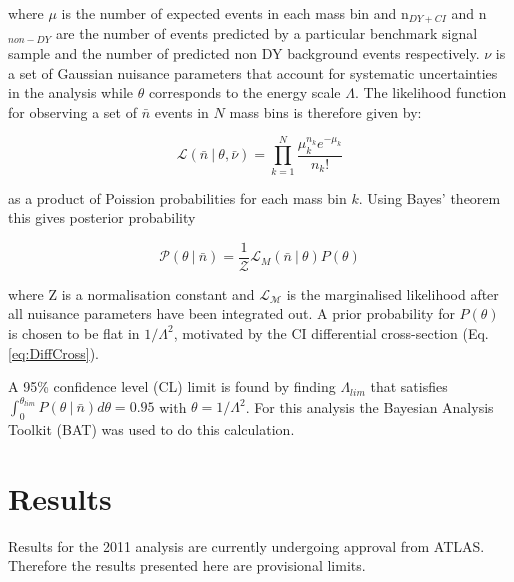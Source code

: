 where $\mu$ is the number of expected events in each mass bin and n$_{DY+CI}$ and n$_{non-DY}$ are the number of events predicted by a particular benchmark signal sample and the number of predicted non DY background events respectively. $\nu$ is a set of Gaussian nuisance parameters that account for systematic uncertainties in the analysis while $\theta$ corresponds to the energy scale $\Lambda$.
The likelihood function for observing a set of $\bar{n}$ events in $N$ mass bins is therefore given by: 

\begin{equation}
        \mathcal{L} (\bar{n}~|~\theta,\bar{\nu}) = \prod_{k=1}^{N} \frac{ \mu_{k}^{n_{k}} e^{-\mu_{k}} }{n_{k}!}
\end{equation}

as a product of Poission probabilities for each mass bin $k$. Using Bayes' theorem this gives posterior probability

\begin{equation}
        \mathcal{P}(\theta~|~\bar{n}) = \frac{1}{\mathcal{Z}} \mathcal{L}_{M}(\bar{n}~|~\theta)P(\theta)
\end{equation}

where Z is a normalisation constant and $\mathcal{L_{M}}$ is the marginalised likelihood after all nuisance parameters have been integrated out. A prior probability for $P(\theta)$ is chosen to be flat in $1/\Lambda^{2}$, motivated by the CI differential cross-section (Eq. \ref{eq:DiffCross}).

A 95\% confidence level (CL) limit is found by finding $\Lambda_{lim}$ that satisfies $\int_{0} ^{\theta_{lim}} P(\theta~|~\bar{n}) d\theta = 0.95$ with $\theta = 1/\Lambda^{2}$. For this analysis the Bayesian Analysis Toolkit (BAT) \cite{BAT} was used to do this calculation. 









\section{Results}
Results for the 2011 analysis are currently undergoing approval from ATLAS. Therefore the results presented here are provisional limits. 


